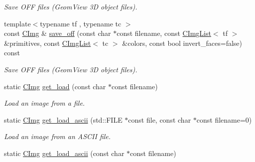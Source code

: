 \begin{DoxyCompactItemize}
\begin{DoxyCompactList}\small\item\em Save OFF files (GeomView 3D object files). \item\end{DoxyCompactList}\item 
\hypertarget{structcimg__library_1_1_c_img_a6083c4e5d3b7b1ebaa195cbaf8e23302}{
{\footnotesize template$<$typename tf , typename tc $>$ }\\const \hyperlink{structcimg__library_1_1_c_img}{CImg} \& \hyperlink{structcimg__library_1_1_c_img_a6083c4e5d3b7b1ebaa195cbaf8e23302}{save\_\-off} (const char $\ast$const filename, const \hyperlink{structcimg__library_1_1_c_img_list}{CImgList}$<$ tf $>$ \&primitives, const \hyperlink{structcimg__library_1_1_c_img_list}{CImgList}$<$ tc $>$ \&colors, const bool invert\_\-faces=false) const }
\label{structcimg__library_1_1_c_img_a6083c4e5d3b7b1ebaa195cbaf8e23302}

\begin{DoxyCompactList}\small\item\em Save OFF files (GeomView 3D object files). \item\end{DoxyCompactList}\item 
static \hyperlink{structcimg__library_1_1_c_img}{CImg} \hyperlink{structcimg__library_1_1_c_img_a33611f3d14a83d92bb29259f14515381}{get\_\-load} (const char $\ast$const filename)
\begin{DoxyCompactList}\small\item\em Load an image from a file. \item\end{DoxyCompactList}\item 
\hypertarget{structcimg__library_1_1_c_img_a3428f57c969dc72aa6efd8f2d8b51db6}{
static \hyperlink{structcimg__library_1_1_c_img}{CImg} \hyperlink{structcimg__library_1_1_c_img_a3428f57c969dc72aa6efd8f2d8b51db6}{get\_\-load\_\-ascii} (std::FILE $\ast$const file, const char $\ast$const filename=0)}
\label{structcimg__library_1_1_c_img_a3428f57c969dc72aa6efd8f2d8b51db6}

\begin{DoxyCompactList}\small\item\em Load an image from an ASCII file. \item\end{DoxyCompactList}\item 
\hypertarget{structcimg__library_1_1_c_img_a83fe2de29d9ccde21e2bc36e95cea931}{
static \hyperlink{structcimg__library_1_1_c_img}{CImg} \hyperlink{structcimg__library_1_1_c_img_a83fe2de29d9ccde21e2bc36e95cea931}{get\_\-load\_\-ascii} (const char $\ast$const filename)}
\label{structcimg__library_1_1_c_img_a83fe2de29d9ccde21e2bc36e95cea931}


\end{DoxyCompactItemize}
